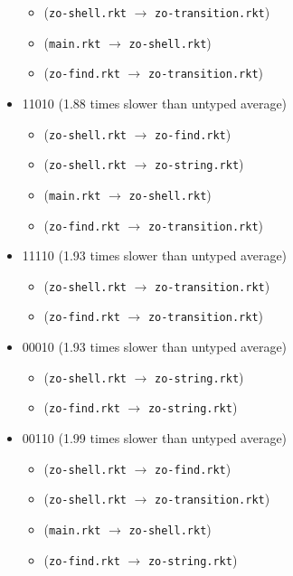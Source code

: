 \documentclass{article}
\newcommand{\mono}[1]{\texttt{#1}}
\begin{document}
\begin{itemize}
  \begin{itemize}
  \item (\mono{zo-shell.rkt} $\rightarrow$ \mono{zo-transition.rkt})
  \item (\mono{main.rkt} $\rightarrow$ \mono{zo-shell.rkt})
  \item (\mono{zo-find.rkt} $\rightarrow$ \mono{zo-transition.rkt})
  \end{itemize}
\item 11010 (1.88 times slower than untyped average)
  \begin{itemize}
  \item (\mono{zo-shell.rkt} $\rightarrow$ \mono{zo-find.rkt})
  \item (\mono{zo-shell.rkt} $\rightarrow$ \mono{zo-string.rkt})
  \item (\mono{main.rkt} $\rightarrow$ \mono{zo-shell.rkt})
  \item (\mono{zo-find.rkt} $\rightarrow$ \mono{zo-transition.rkt})
  \end{itemize}
\item 11110 (1.93 times slower than untyped average)
  \begin{itemize}
  \item (\mono{zo-shell.rkt} $\rightarrow$ \mono{zo-transition.rkt})
  \item (\mono{zo-find.rkt} $\rightarrow$ \mono{zo-transition.rkt})
  \end{itemize}
\item 00010 (1.93 times slower than untyped average)
  \begin{itemize}
  \item (\mono{zo-shell.rkt} $\rightarrow$ \mono{zo-string.rkt})
  \item (\mono{zo-find.rkt} $\rightarrow$ \mono{zo-string.rkt})
  \end{itemize}
\item 00110 (1.99 times slower than untyped average)
  \begin{itemize}
  \item (\mono{zo-shell.rkt} $\rightarrow$ \mono{zo-find.rkt})
  \item (\mono{zo-shell.rkt} $\rightarrow$ \mono{zo-transition.rkt})
  \item (\mono{main.rkt} $\rightarrow$ \mono{zo-shell.rkt})
  \item (\mono{zo-find.rkt} $\rightarrow$ \mono{zo-string.rkt})
  \end{itemize}


\end{itemize}
\end{document}
